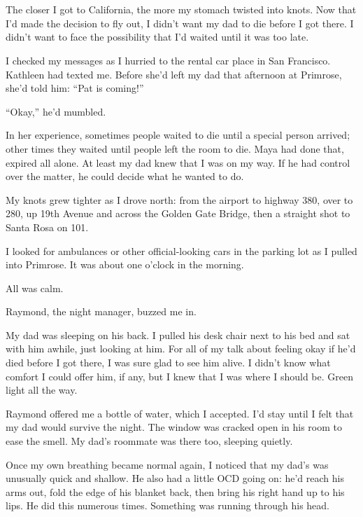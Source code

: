 \documentclass[12pt]{book}
\begin{document}
\chapter{}

The closer I got to California, the more my stomach twisted into knots. Now that I'd made the decision to fly out, I didn't want my dad to die before I got there. I didn't want to face the possibility that I'd waited until it was too late.

I checked my messages as I hurried to the rental car place in San Francisco. Kathleen had texted me. Before she'd left my dad that afternoon at Primrose, she'd told him: ``Pat is coming!''

``Okay,'' he'd mumbled.

In her experience, sometimes people waited to die until a special person arrived; other times they waited until people left the room to die. Maya had done that, expired all alone. At least my dad knew that I was on my way. If he had control over the matter, he could decide what he wanted to do.

My knots grew tighter as I drove north: from the airport to highway 380, over to 280, up 19th Avenue and across the Golden Gate Bridge, then a straight shot to Santa Rosa on 101.

I looked for ambulances or other official-looking cars in the parking lot as I pulled into Primrose. It was about one o'clock in the morning.

All was calm.

Raymond, the night manager, buzzed me in.

My dad was sleeping on his back. I pulled his desk chair next to his bed and sat with him awhile, just looking at him. For all of my talk about feeling okay if he'd died before I got there, I was sure glad to see him alive. I didn't know what comfort I could offer him, if any, but I knew that I was where I should be. Green light all the way.

Raymond offered me a bottle of water, which I accepted. I'd stay until I felt that my dad would survive the night. The window was cracked open in his room to ease the smell. My dad's roommate was there too, sleeping quietly.

Once my own breathing became normal again, I noticed that my dad's was unusually quick and shallow. He also had a little OCD going on: he'd reach his arms out, fold the edge of his blanket back, then bring his right hand up to his lips. He did this numerous times. Something was running through his head.
\end{document}
